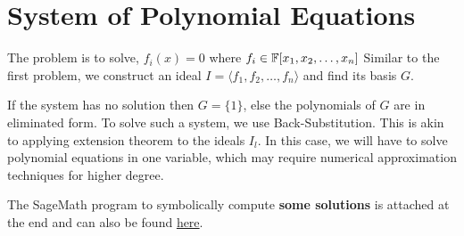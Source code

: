 \documentclass[a4paper,11pt]{article}
\begin{document}
\section{System of Polynomial Equations}
The problem is to solve, $f_i(x)=0$ where $f_i\in\mathbb{F}[x_1, x_2, \ldots, x_n]$
Similar to the first problem, we construct an ideal $I=\langle f_1,f_2,\ldots,f_n\rangle$ and find its \Grob basis $G$.

If the system has no solution then $G=\{1\}$, else the polynomials of $G$ are in eliminated form. To solve such a system, we use Back-Substitution. This is akin to applying extension theorem to the ideals $I_{l}$. In this case, we will have to solve polynomial equations in one variable, which may require numerical approximation techniques for higher degree. 

The SageMath program to symbolically compute \textbf{some solutions} is attached at the end and can also be found \href{https://github.com/paramrathour/Groebner-Basis-Applications/blob/main/System of Polynomial Equations Solver.ipynb}{here}.
\end{document}
